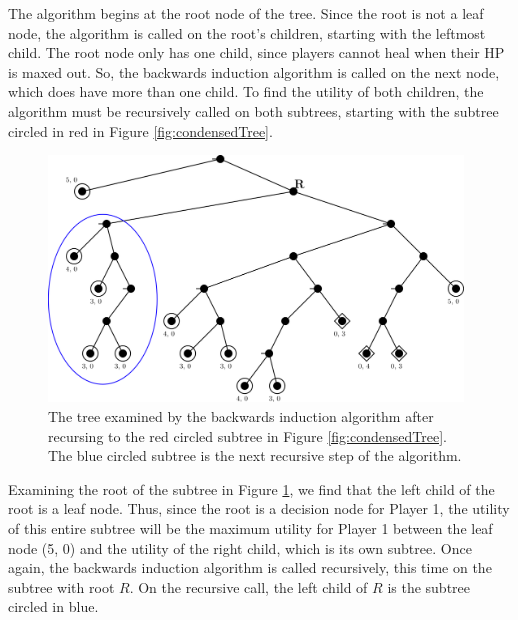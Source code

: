 The algorithm begins at the root node of the tree. Since the root is not a leaf node, the algorithm is called on the root's children, starting with the leftmost child. The root node only has one child, since players cannot heal when their HP is maxed out. So, the backwards induction algorithm is called on the next node, which does have more than one child. To find the utility of both children, the algorithm must be recursively called on both subtrees, starting with the subtree circled in red in Figure \ref{fig:condensedTree}.\\

\begin{figure}[H]
  \centering
  \includegraphics[width=11cm]{figures/Backwards1.png}
  \caption{The tree examined by the backwards induction algorithm after recursing to the red circled subtree in Figure \ref{fig:condensedTree}. The blue circled subtree is the next recursive step of the algorithm.}
  \label{fig:backwards1}
\end{figure}
Examining the root of the subtree in Figure \ref{fig:backwards1}, we find that the left child of the root is a leaf node. Thus, since the root is a decision node for Player 1, the utility of this entire subtree will be the maximum utility for Player 1 between the leaf node (5, 0) and the utility of the right child, which is its own subtree. Once again, the backwards induction algorithm is called recursively, this time on the subtree with root $R$. On the recursive call, the left child of $R$ is the subtree circled in blue.\\

